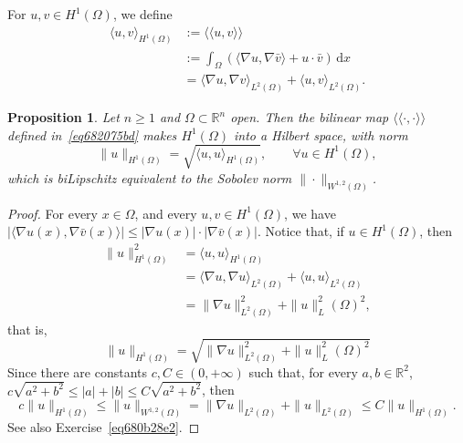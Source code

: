 \documentclass[a4paper,9pt]{amsart}
\newcommand{\R}{\mathbb{R}}	%
\newcommand{\did}{\,\mathrm{d}}	%
\newcommand{\grad}{\nabla}
\newcommand{\llangle}{\langle\!\langle}
\newcommand{\rrangle}{\rangle\!\rangle}
\theoremstyle{plain}
\newtheorem{proposition}{Proposition}[section]
\theoremstyle{definition}
\theoremstyle{remark}
\begin{document}
For $u,v\in H^1(\Omega)$, we define
\begin{equation}\label{eq682075bd}
\begin{aligned}
	\langle u,v \rangle_{H^1(\Omega)}
		&:= \llangle u,v \rrangle \\
		&:= \int_\Omega \left( \langle \grad u ,\grad\bar v \rangle + u\cdot\bar v\right) \did x  \\
		&= \langle \grad u,\grad v \rangle_{L^2(\Omega)} + \langle u,v \rangle_{L^2(\Omega)} .
\end{aligned}
\end{equation}

\begin{proposition}\label{prop6820787a}
	Let $n\ge1$ and $\Omega\subset\R^n$ open.
	Then the bilinear map $\llangle \cdot,\cdot \rrangle$ defined in~\eqref{eq682075bd}
	makes $H^1(\Omega)$ into a Hilbert space,
	with norm
	\begin{equation}
		\|u\|_{H^1(\Omega)} = \sqrt{ \langle u,u \rangle_{H^1(\Omega)} } ,
		\qquad\forall u\in H^1(\Omega) ,
	\end{equation}
	which is biLipschitz equivalent to the Sobolev norm $\|\cdot\|_{W^{1,2}(\Omega)}$.
\end{proposition}
\begin{proof}
	For every $x\in\Omega$, and every $u,v\in H^1(\Omega)$, we have 
	$|\langle \grad u(x) ,\grad\bar v(x) \rangle| 
	\le |\grad u(x)| \cdot |\grad\bar v(x)|$.
	Notice that, if $u\in H^1(\Omega)$, then
	\begin{align}
		\|u\|_{H^1(\Omega)}^2 
		&= \langle u,u \rangle_{H^1(\Omega)} \\
		&= \langle \grad u,\grad u \rangle_{L^2(\Omega)} + \langle u,u \rangle_{L^2(\Omega)} \\
		&= \|\grad u\|_{L^2(\Omega)}^2 + \|u\|_L^2(\Omega)^2 ,
	\end{align}
	that is,
	\begin{equation}
		\|u\|_{H^1(\Omega)} = \sqrt{\|\grad u\|_{L^2(\Omega)}^2 + \|u\|_L^2(\Omega)^2}
	\end{equation}
	Since there are constants $c,C\in(0,+\infty)$ such that, for every $a,b\in\R^2$,
	$c \sqrt{a^2+b^2} \le |a| + |b| \le C \sqrt{a^2+b^2}$,
	then 
	\begin{equation}\label{eq682077d7}
		c\|u\|_{H^1(\Omega)}
		\le \|u\|_{W^{1,2}(\Omega)} = \|\grad u\|_{L^2(\Omega)} + \|u\|_{L^2(\Omega)} 
		\le C \|u\|_{H^1(\Omega)} .
	\end{equation}
	See also Exercise~\ref{eq680b28e2}.
\end{proof}
\end{document}
